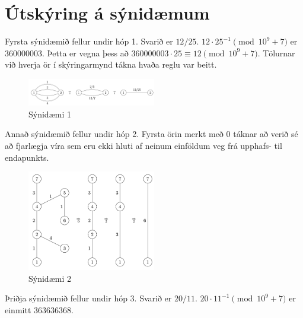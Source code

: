 
\section*{Útskýring á sýnidæmum}
Fyrsta sýnidæmið fellur undir hóp 1. Svarið er $12/25$. $12 \cdot 25^{-1} \pmod{10^9 + 7}$ er $360000003$. Þetta er vegna þess að $360000003 \cdot 25 \equiv 12 \pmod{10^9 + 7}$. Tölurnar við hverja ör í skýringarmynd tákna hvaða reglu var beitt. \\

\begin{figure}[h!]
  \centering
    \includegraphics[width=0.5\textwidth]{sample1}
  \caption{Sýnidæmi 1}
\end{figure}

Annað sýnidæmið fellur undir hóp 2. Fyrsta örin merkt með $0$ táknar að verið sé að fjarlægja víra sem eru ekki hluti af neinum einföldum veg frá upphafs- til endapunkts. 

\begin{figure}[h!]
  \centering
    \includegraphics[width=0.5\textwidth]{sample2}
  \caption{Sýnidæmi 2}
\end{figure}

Þriðja sýnidæmið fellur undir hóp 3. Svarið er $20/11$. $20 \cdot 11^{-1} \pmod{10^9 + 7}$ er einmitt $363636368$. \\

